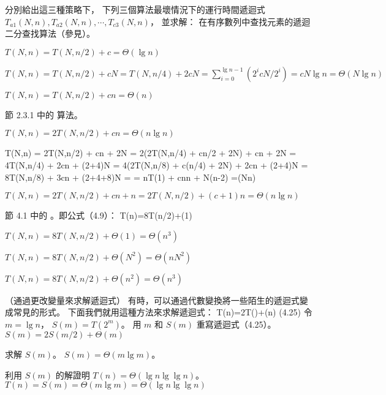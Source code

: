 分別給出這三種策略下，
下列三個算法最壞情況下的運行時間遞迴式 $T_{a1}(N,n), T_{a2}(N,n),\cdots,T_{c3}(N,n)$，
並求解：
\startigBase[a]
在有序數列中查找元素的遞迴二分查找算法（參見）。
\stopitem
\startANSWER
\startigBase[n]
\item $T(N,n) = T(N,n/2) + c = \Theta(\lg n)$
\item $T(N,n) = T(N,n/2) + cN = T(N,n/4) + 2cN = \sum_{i=0}^{\lg n - 1}(2^i cN/2^i) = cN\lg n = \Theta(N\lg n)$
\item $T(N,n) = T(N,n/2) + cn = \Theta(n)$
\stopigBase
\stopANSWER

\startitem
節 2.3.1 中的  算法。
\stopitem
\startANSWER
\startigBase[n]
\item $T(N,n) = 2T(N,n/2) + cn = \Theta(n\lg{n})$
\item
\startformula\startmathalignment
\NC T(N,n) \NC= 2T(N,n/2) + cn + 2N \NR
\NC      \NC= 2(2T(N,n/4) + cn/2 + 2N) + cn + 2N \NR
\NC      \NC= 4T(N,n/4) + 2cn + (2+4)N \NR
\NC      \NC= 4(2T(N,n/8) + c(n/4) + 2N) + 2cn + (2+4)N \NR
\NC      \NC= 8T(N,n/8) + 3cn + (2+4+8)N \NR
\NC      \NC= \cdots \NR
\NC      \NC= nT(1) + cn\lg n + N(n-2) \NR
\NC      \NC=\Theta(Nn) \NR
\stopmathalignment\stopformula
\item $T(N,n) = 2T(N,n/2) + cn + n = 2T(N,n/2) + (c+1)n = \Theta(n\lg{n})$
\stopigBase
\stopANSWER

\startitem
節 4.1 中的 。即公式（4.9）：
\startformula
T(n)=8T(n/2)+\Theta(1)
\stopformula
\stopitem
\startANSWER
\startigBase[n]
\item $T(N,n) = 8T(N,n/2) + \Theta(1) = \Theta(n^3)$
\item $T(N,n) = 8T(N,n/2) + \Theta(N^2) = \Theta(n N^2)$
\item $T(N,n) = 8T(N,n/2) + \Theta(n^2) = \Theta(n^3)$
\stopigBase
\stopANSWER
\stopigBase
\stopPROBLEM

\startPROBLEM（通過更改變量來求解遞迴式）
有時，可以通過代數變換將一些陌生的遞迴式變成常見的形式。
下面我們就用這種方法來求解遞迴式：
\startformula
T(n)=2T()+\Theta(\lg n)	\hfill (4.25)
\stopformula
\startigBase[a]
\startitem
令 $m=\lg n$， $S(m)=T(2^m)$。
用 $m$ 和 $S(m)$ 重寫遞迴式（4.25）。
\stopitem
\startANSWER
$S(m)=2S(m/2)+\Theta(m)$
\stopANSWER

\startitem
求解 $S(m)$。
\stopitem
\startANSWER
$S(m)=\Theta(m\lg m)$。
\stopANSWER

\startitem
利用 $S(m)$ 的解證明 $T(n)=\Theta(\lg n \lg\lg n)$。
\stopitem
\startANSWER
$T(n)=S(m)=\Theta(m\lg m)=\Theta(\lg n\lg\lg n)$
\stopANSWER

